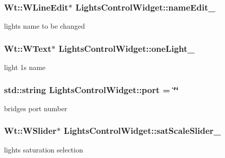 \subsubsection[{\texorpdfstring{name\+Edit\+\_\+}{nameEdit_}}]{\setlength{\rightskip}{0pt plus 5cm}Wt\+::\+W\+Line\+Edit$\ast$ Lights\+Control\+Widget\+::name\+Edit\+\_\+\hspace{0.3cm}{\ttfamily [private]}}\hypertarget{classLightsControlWidget_aff7b495c562df75a6006ad6bef43f96f}{}\label{classLightsControlWidget_aff7b495c562df75a6006ad6bef43f96f}
light\textquotesingle{}s name to be changed 
\subsubsection[{\texorpdfstring{one\+Light\+\_\+}{oneLight_}}]{\setlength{\rightskip}{0pt plus 5cm}Wt\+::\+W\+Text$\ast$ Lights\+Control\+Widget\+::one\+Light\+\_\+\hspace{0.3cm}{\ttfamily [private]}}\hypertarget{classLightsControlWidget_a5d33dac9a47a7862e6cc060e1e0fb335}{}\label{classLightsControlWidget_a5d33dac9a47a7862e6cc060e1e0fb335}
light 1\textquotesingle{}s name 
\subsubsection[{\texorpdfstring{port}{port}}]{\setlength{\rightskip}{0pt plus 5cm}std\+::string Lights\+Control\+Widget\+::port = \char`\"{}\char`\"{}\hspace{0.3cm}{\ttfamily [private]}}\hypertarget{classLightsControlWidget_a5760f7ec7c3c36e8faf00ae6b2633ab5}{}\label{classLightsControlWidget_a5760f7ec7c3c36e8faf00ae6b2633ab5}
bridge\textquotesingle{}s port number 
\subsubsection[{\texorpdfstring{sat\+Scale\+Slider\+\_\+}{satScaleSlider_}}]{\setlength{\rightskip}{0pt plus 5cm}Wt\+::\+W\+Slider$\ast$ Lights\+Control\+Widget\+::sat\+Scale\+Slider\+\_\+\hspace{0.3cm}{\ttfamily [private]}}\hypertarget{classLightsControlWidget_af957447fbfc39f4f0c87081be5cf2bf5}{}\label{classLightsControlWidget_af957447fbfc39f4f0c87081be5cf2bf5}
light\textquotesingle{}s saturation selection 
